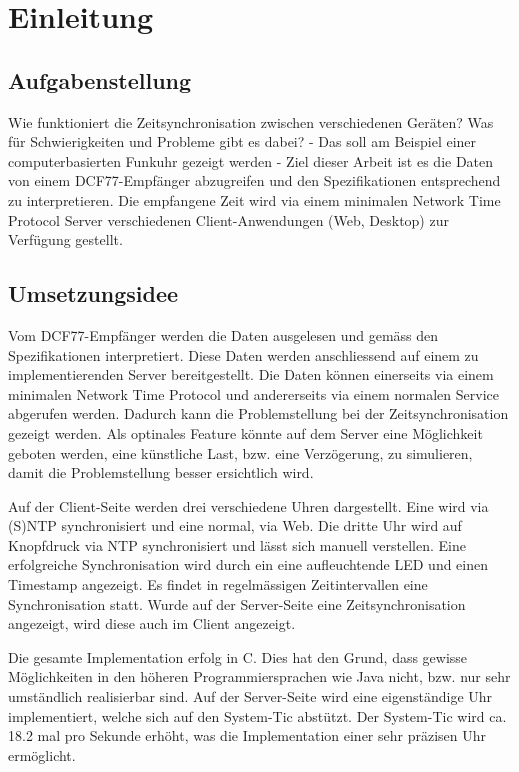 
\chapter{Einleitung}



\section{Aufgabenstellung}

Wie funktioniert die Zeitsynchronisation zwischen verschiedenen Geräten? Was für Schwierigkeiten und Probleme gibt es dabei? - Das soll am Beispiel einer computerbasierten Funkuhr gezeigt werden - Ziel dieser Arbeit ist es die Daten von einem DCF77-Empfänger abzugreifen und den Spezifikationen entsprechend zu interpretieren. Die empfangene Zeit wird via einem minimalen Network Time Protocol Server verschiedenen Client-Anwendungen (Web, Desktop) zur Verfügung gestellt.

\section{Umsetzungsidee}

Vom DCF77-Empfänger werden die Daten ausgelesen und gemäss den Spezifikationen interpretiert. Diese Daten werden anschliessend auf einem zu implementierenden Server bereitgestellt. Die Daten können einerseits via einem minimalen Network Time Protocol und andererseits via einem normalen Service abgerufen werden. Dadurch kann die Problemstellung bei der Zeitsynchronisation gezeigt werden. Als optinales Feature könnte auf dem Server eine Möglichkeit geboten werden, eine künstliche Last, bzw. eine Verzögerung, zu simulieren, damit die Problemstellung besser ersichtlich wird.

Auf der Client-Seite werden drei verschiedene Uhren dargestellt. Eine wird via (S)NTP synchronisiert und eine normal, via Web. Die dritte Uhr wird auf Knopfdruck via NTP synchronisiert und lässt sich manuell verstellen. Eine erfolgreiche Synchronisation wird durch ein eine aufleuchtende LED und einen Timestamp angezeigt. Es findet in regelmässigen Zeitintervallen eine Synchronisation statt. Wurde auf der Server-Seite eine Zeitsynchronisation angezeigt, wird diese auch im Client angezeigt.

Die gesamte Implementation erfolg in C. Dies hat den Grund, dass gewisse Möglichkeiten in den höheren Programmiersprachen wie Java nicht, bzw. nur sehr umständlich realisierbar sind. Auf der Server-Seite wird eine eigenständige Uhr implementiert, welche sich auf den System-Tic abstützt. Der System-Tic wird ca. 18.2 mal pro Sekunde erhöht, was die Implementation einer sehr präzisen Uhr ermöglicht. 
